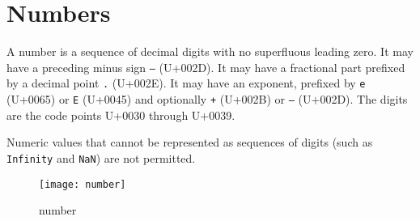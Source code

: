 
\section{Numbers}

A number is a sequence of decimal digits with no superfluous leading zero.
It may have a preceding minus sign \texttt{–} (U+002D).
It may have a fractional part prefixed by a decimal point \texttt{.} (U+002E).
It may have an exponent, prefixed by \texttt{e} (U+0065) or \texttt{E} (U+0045) and optionally \texttt{+} (U+002B) or \texttt{–} (U+002D).
The digits are the code points U+0030 through U+0039.

Numeric values that cannot be represented as sequences of digits (such as \texttt{Infinity} and \texttt{NaN}) are not permitted.

\begin{figure}[H]
	\centering
	\texttt{[image: number]}
	\caption{number}
	\label{f:nums}
\end{figure}

%		
%		
%		
